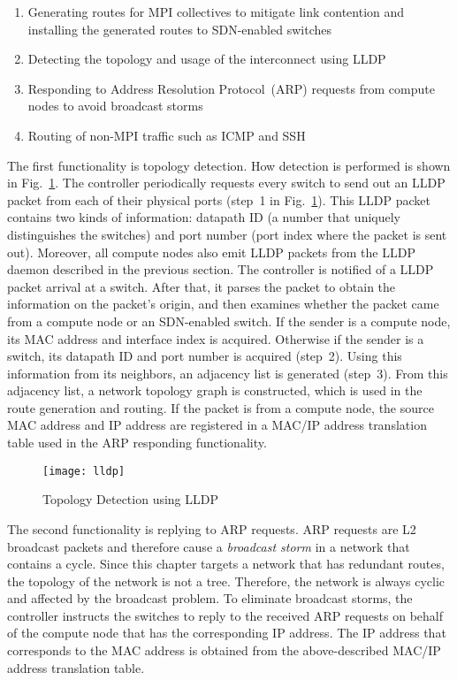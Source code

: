 \begin{enumerate}
    \item Generating routes for MPI collectives to mitigate link contention
          and installing the generated routes to SDN-enabled switches
    \item Detecting the topology and usage of the interconnect using LLDP
    \item Responding to Address Resolution Protocol~(ARP) requests from
          compute nodes to avoid broadcast storms
    \item Routing of non-MPI traffic such as ICMP and SSH
\end{enumerate}

The first functionality is topology detection. How detection is
performed is shown in Fig.~\ref{fig:lldp}. The controller periodically
requests every switch to send out an LLDP packet from each of their physical
ports (step~1 in Fig.~\ref{fig:lldp}). This LLDP packet contains two kinds of
information: datapath ID (a number that uniquely distinguishes the switches)
and port number (port index where the packet is sent out). Moreover, all
compute nodes also emit LLDP packets from the LLDP daemon described in the
previous section. The controller is notified of a LLDP packet arrival at a
switch. After that, it parses the packet to obtain the information on the
packet's origin, and then examines whether the packet came from a compute node
or an SDN-enabled switch. If the sender is a compute node, its MAC address and
interface index is acquired. Otherwise if the sender is a switch, its datapath
ID and port number is acquired (step~2). Using this information from its
neighbors, an adjacency list is generated (step~3). From this adjacency list,
a network topology graph is constructed, which is used in the route generation
and routing. If the packet is from a compute node, the source MAC address and
IP address are registered in a MAC/IP address translation table used in the
ARP responding functionality.

\begin{figure}
    \centering
    \texttt{[image: lldp]}
    \caption{Topology Detection using LLDP}%
    \label{fig:lldp}
\end{figure}

The second functionality is replying to ARP requests. ARP requests are L2
broadcast packets and therefore cause a \emph{broadcast storm} in a network
that contains a cycle. Since this chapter targets a network that has redundant
routes, the topology of the network is not a tree. Therefore, the network is
always cyclic and affected by the broadcast problem. To eliminate broadcast
storms, the controller instructs the switches to reply to the received ARP
requests on behalf of the compute node that has the corresponding IP address.
The IP address that corresponds to the MAC address is obtained from the
above-described MAC/IP address translation table.

